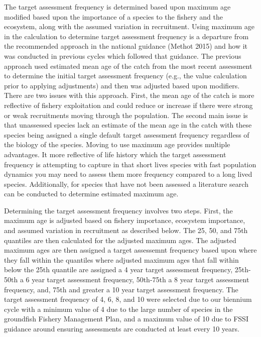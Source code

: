\documentclass[11pt,
  english,
  a4paper,
]{article}
\begin{document}
The target assessment frequency is determined based upon maximum age modified based upon the importance of a species to the fishery and the ecosystem, along with the assumed variation in recruitment. Using maximum age in the calculation to determine target assessment frequency is a departure from the recommended approach in the national guidance (Methot 2015) and how it was conducted in previous cycles which followed that guidance. The previous approach used estimated mean age of the catch from the most recent assessment to determine the initial target assessment frequency (e.g., the value calculation prior to applying adjustments) and then was adjusted based upon modifiers. There are two issues with this approach. First, the mean age of the catch is more reflective of fishery exploitation and could reduce or increase if there were strong or weak recruitments moving through the population. The second main issue is that unassessed species lack an estimate of the mean age in the catch with these species being assigned a single default target assessment frequency regardless of the biology of the species. Moving to use maximum age provides multiple advantages. It more reflective of life history which the target assessment frequency is attempting to capture in that short lives species with fast population dynamics you may need to assess them more frequency compared to a long lived species. Additionally, for species that have not been assessed a literature search can be conducted to determine estimated maximum age.

Determining the target assessment frequency involves two steps. First, the maximum age is adjusted based on fishery importance, ecosystem importance, and assumed variation in recruitment as described below. The 25, 50, and 75th quantiles are then calculated for the adjusted maximum ages. The adjusted maximum ages are then assigned a target assessemnt frequency based upon where they fall within the quantiles where adjusted maximum ages that fall within below the 25th quantile are assigned a 4 year target assessment frequency, 25th-50th a 6 year target assessment frequency, 50th-75th a 8 year target assessment frequency, and, 75th and greater a 10 year target assessment frequency. The target assessment frequency of 4, 6, 8, and 10 were selected due to our biennium cycle with a minimum value of 4 due to the large number of species in the groundfish Fishery Management Plan, and a maximum value of 10 due to FSSI guidance around ensuring assessments are conducted at least every 10 years.
\end{document}
